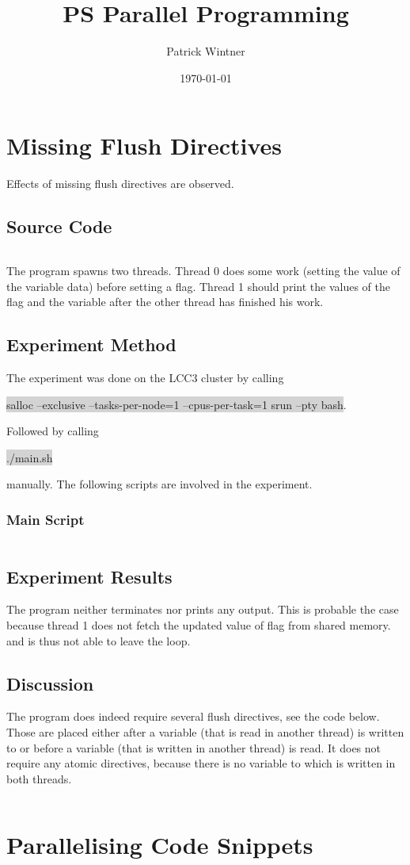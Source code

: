 \documentclass[parskip]{scrartcl}
\title{PS Parallel Programming}
\author{Patrick Wintner}
\date{\today}
\begin{document}
	\maketitle
	
	\section{Missing Flush Directives}
	Effects of missing flush directives are observed.
	\subsection{Source Code}
	\inputminted	[linenos]{c}{ex1/ex1.c}
	
	The program spawns two threads. Thread 0 does some  work (setting the value of the variable data) before setting a flag. Thread 1 should print the values of the flag and the variable after the other thread has finished his work.
	
	\subsection{Experiment Method}
	The experiment was done on the LCC3 cluster by calling 
	\begin{center}
		\colorbox{lightgray}{salloc --exclusive --tasks-per-node=1 --cpus-per-task=1 srun --pty bash}.
	\end{center} 
	Followed by calling 
	\begin{center}
		\colorbox{lightgray}{./main.sh}
	\end{center}		
	manually. The following scripts are involved in the experiment.
	\subsubsection{Main Script}
	\inputminted[linenos]{bash}{ex1/main.sh}
	
	\subsection{Experiment Results}
	The program neither terminates nor prints any output. This is probable the case because thread 1 does not fetch the updated value of flag from shared memory.  and is thus not able to leave the loop.
	
	\subsection{Discussion}
	The program does indeed require several flush directives, see the code below. Those are placed either after a variable (that is read in another thread) is written to or before a variable (that is written in another thread) is read. It does not require any atomic directives, because there is no variable to which is written in both threads.
	
	\inputminted[linenos]{bash}{ex1/ex1_improved.c}
	
	\section{Parallelising Code Snippets}
\end{document}
